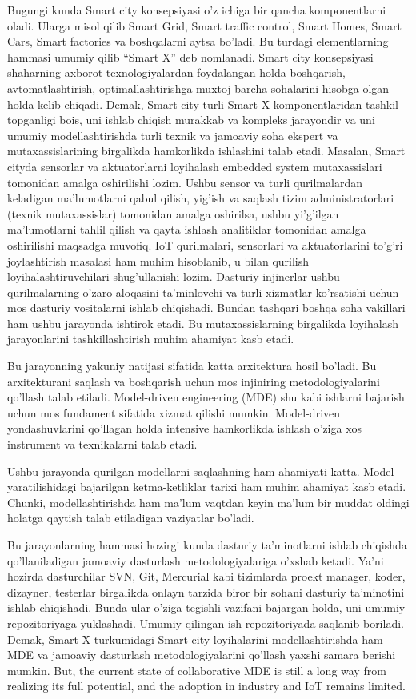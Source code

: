 Bugungi kunda Smart city konsepsiyasi o’z ichiga bir qancha komponentlarni oladi. Ularga misol qilib Smart Grid, Smart traffic control, Smart Homes, Smart Cars, Smart factories va boshqalarni aytsa bo’ladi. Bu turdagi elementlarning hammasi umumiy qilib “Smart X” deb nomlanadi. 
Smart city konsepsiyasi shaharning axborot texnologiyalardan foydalangan holda boshqarish, avtomatlashtirish, optimallashtirishga muxtoj barcha sohalarini hisobga olgan holda kelib chiqadi. 
Demak, Smart city turli Smart X komponentlaridan tashkil topganligi bois, uni ishlab chiqish murakkab va kompleks jarayondir va uni umumiy modellashtirishda turli texnik va jamoaviy soha ekspert va mutaxassislarining birgalikda hamkorlikda ishlashini talab etadi. Masalan, Smart cityda sensorlar va aktuatorlarni loyihalash embedded system mutaxassislari tomonidan amalga oshirilishi lozim. Ushbu sensor va turli qurilmalardan keladigan ma’lumotlarni qabul qilish, yig’ish va saqlash tizim administratorlari (texnik mutaxassislar) tomonidan amalga oshirilsa, ushbu yi’g’ilgan ma’lumotlarni tahlil qilish va qayta ishlash analitiklar tomonidan amalga oshirilishi maqsadga muvofiq. IoT qurilmalari, sensorlari va aktuatorlarini to’g’ri joylashtirish masalasi ham muhim hisoblanib, u bilan qurilish loyihalashtiruvchilari shug’ullanishi lozim. Dasturiy injinerlar ushbu qurilmalarning o’zaro aloqasini ta’minlovchi va turli xizmatlar ko’rsatishi uchun mos dasturiy vositalarni ishlab chiqishadi. Bundan tashqari boshqa soha vakillari ham ushbu jarayonda ishtirok etadi. Bu mutaxassislarning birgalikda loyihalash jarayonlarini tashkillashtirish muhim ahamiyat kasb etadi. 

Bu jarayonning yakuniy natijasi sifatida katta arxitektura hosil bo’ladi. Bu arxitekturani saqlash va boshqarish uchun mos injiniring metodologiyalarini qo’llash talab etiladi.  Model-driven engineering (MDE) shu kabi ishlarni bajarish uchun mos fundament sifatida xizmat qilishi mumkin. Model-driven yondashuvlarini qo’llagan holda intensive hamkorlikda ishlash o’ziga xos instrument va texnikalarni talab etadi. 

Ushbu jarayonda qurilgan modellarni saqlashning ham ahamiyati katta. Model yaratilishidagi bajarilgan ketma-ketliklar tarixi ham muhim ahamiyat kasb etadi. Chunki, modellashtirishda ham ma’lum vaqtdan keyin ma’lum bir muddat oldingi holatga qaytish talab etiladigan vaziyatlar bo’ladi.

Bu jarayonlarning hammasi hozirgi kunda dasturiy ta’minotlarni ishlab chiqishda qo’llaniladigan jamoaviy dasturlash metodologiyalariga o’xshab ketadi. Ya’ni hozirda dasturchilar SVN, Git, Mercurial kabi tizimlarda proekt manager, koder, dizayner, testerlar birgalikda onlayn tarzida biror bir sohani dasturiy ta’minotini ishlab chiqishadi. Bunda ular o’ziga tegishli vazifani bajargan holda, uni umumiy repozitoriyaga yuklashadi. Umumiy qilingan ish repozitoriyada saqlanib boriladi.
Demak, Smart X turkumidagi Smart city loyihalarini modellashtirishda ham MDE va jamoaviy dasturlash metodologiyalarini qo’llash yaxshi samara berishi mumkin. But, the current state of collaborative MDE is still a long way from realizing its full potential, and the adoption in industry and IoT remains limited.
